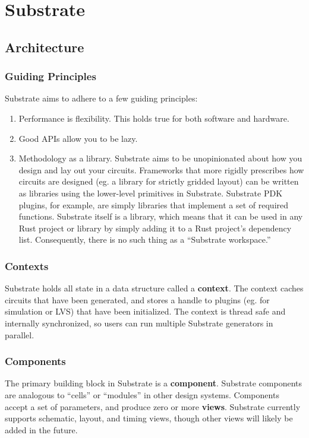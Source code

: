 \chapter{Substrate}

\section{Architecture}
\subsection{Guiding Principles}

Substrate aims to adhere to a few guiding principles:
\begin{enumerate}
\item Performance is flexibility. This holds true for both software and hardware.
\item Good APIs allow you to be lazy.
\item Methodology as a library. Substrate aims to be unopinionated about how you design and lay out your circuits.
  Frameworks that more rigidly prescribes how circuits are designed (eg. a library for strictly gridded layout)
  can be written as libraries using the lower-level primitives in Substrate.
  Substrate PDK plugins, for example, are simply libraries that implement a set of required functions.
  Substrate itself is a library, which means that it can be used in any Rust project or library by simply adding it to a Rust project's dependency list. Consequently, there is no such thing as a ``Substrate workspace.''
\end{enumerate}

\subsection{Contexts}

Substrate holds all state in a data structure called a \textbf{context}.
The context caches circuits that have been generated, and stores a handle to plugins (eg. for simulation or LVS) that have been initialized.
The context is thread safe and internally synchronized, so users can run multiple Substrate generators in parallel.

\subsection{Components}

The primary building block in Substrate is a \textbf{component}.
Substrate components are analogous to ``cells'' or ``modules'' in other design systems.
Components accept a set of parameters, and produce zero or more \textbf{views}.
Substrate currently supports schematic, layout, and timing views,
though other views will likely be added in the future.

